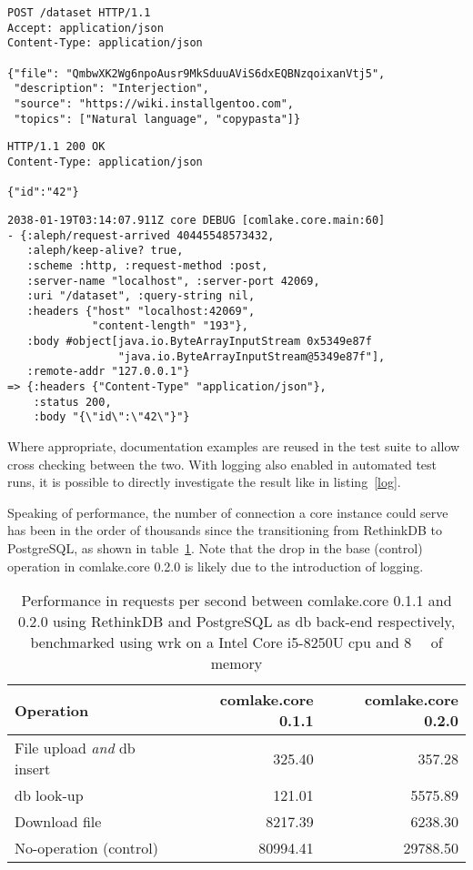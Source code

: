 \begin{lstlisting}[label=request,caption=Example request adding a dataset]
POST /dataset HTTP/1.1
Accept: application/json
Content-Type: application/json

{"file": "QmbwXK2Wg6npoAusr9MkSduuAViS6dxEQBNzqoixanVtj5",
 "description": "Interjection",
 "source": "https://wiki.installgentoo.com",
 "topics": ["Natural language", "copypasta"]}
\end{lstlisting}

\begin{lstlisting}[label=response,caption=Example response
  from a successful a dataset insertion]
HTTP/1.1 200 OK
Content-Type: application/json

{"id":"42"}
\end{lstlisting}

\begin{lstlisting}[label=log,caption={Example log output,
  formatted for readability}]
2038-01-19T03:14:07.911Z core DEBUG [comlake.core.main:60]
- {:aleph/request-arrived 40445548573432,
   :aleph/keep-alive? true,
   :scheme :http, :request-method :post,
   :server-name "localhost", :server-port 42069,
   :uri "/dataset", :query-string nil,
   :headers {"host" "localhost:42069",
             "content-length" "193"},
   :body #object[java.io.ByteArrayInputStream 0x5349e87f
                 "java.io.ByteArrayInputStream@5349e87f"],
   :remote-addr "127.0.0.1"}
=> {:headers {"Content-Type" "application/json"},
    :status 200,
    :body "{\"id\":\"42\"}"}
\end{lstlisting}

Where appropriate, documentation examples are reused in the test suite
to allow cross checking between the two.  With logging also enabled
in automated test runs, it is possible to directly investigate the result
like in listing~\ref{log}.

Speaking of performance, the number of connection a core instance could serve
has been in the order of thousands since the transitioning from RethinkDB
to PostgreSQL, as shown in table~\ref{rdbpsql}.  Note that the drop in
the base (control) operation in comlake.core 0.2.0 is likely due to
the introduction of logging.
\begin{table}\centering
  \caption{Performance in requests per second between comlake.core 0.1.1
  and 0.2.0 using RethinkDB and PostgreSQL as \gls{db} back-end respectively,
  benchmarked using wrk on a Intel\textsuperscript{\tiny\textregistered}
  Core\textsuperscript{\tiny\texttrademark} i5-8250U \acrshort{cpu} and
  \SI{8}{\giga\byte} of memory}
  \begin{tabular}{l r r}
    \toprule
    Operation & comlake.core 0.1.1 & comlake.core 0.2.0\\
    \midrule
    File upload \emph{and} \gls{db} insert & 325.40 & 357.28\\
    \gls{db} look-up & 121.01 & 5575.89\\
    Download file & 8217.39 & 6238.30\\
    No-operation (control) & 80994.41 & 29788.50\\
    \bottomrule
  \end{tabular}
  \label{rdbpsql}
\end{table}

